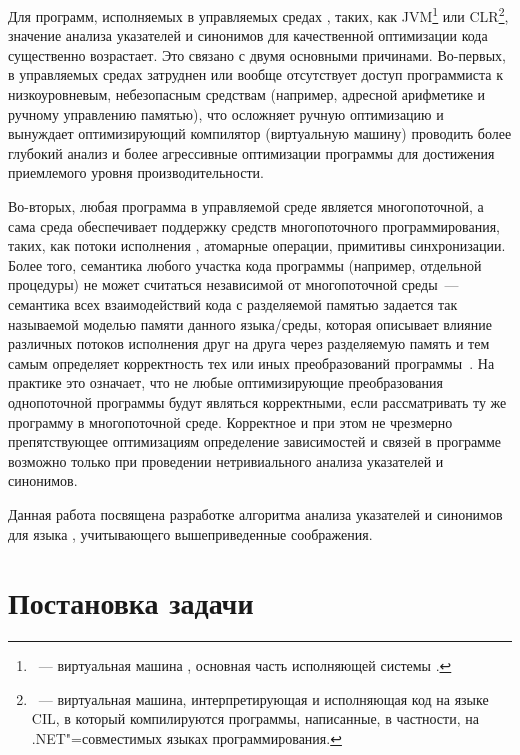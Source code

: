 \documentclass[14pt,titlepage,draft]{extarticle}
\newcommand{\java}{\eng{Java}\xspace}
\begin{document}
    Для программ, исполняемых в управляемых средах , таких, как JVM\footnote{~---
    виртуальная машина \java, основная часть исполняющей системы \java.} или
    CLR\footnote{~--- виртуальная машина,
    интерпретирующая и исполняющая код на языке CIL, в который компилируются
    программы, написанные, в частности, на .NET"=совместимых языках
    программирования.}, значение анализа указателей и синонимов для
    качественной оптимизации кода существенно возрастает. Это связано с двумя
    основными причинами. Во-первых, в управляемых средах затруднен или вообще
    отсутствует доступ программиста к низкоуровневым, небезопасным средствам
    (например, адресной арифметике и ручному управлению памятью), что
    осложняет ручную оптимизацию и вынуждает оптимизирующий компилятор
    (виртуальную машину) проводить более глубокий анализ и более агрессивные
    оптимизации программы для достижения приемлемого уровня производительности.

    Во-вторых, любая программа в управляемой среде является многопоточной, а
    сама среда обеспечивает поддержку средств многопоточного программирования,
    таких, как потоки исполнения , атомарные операции,
    примитивы синхронизации. Более того, семантика любого участка кода
    программы (например, отдельной процедуры) не может считаться
    независимой от многопоточной среды~--- семантика всех взаимодействий кода с
    разделяемой памятью задается так называемой моделью памяти данного
    языка/среды, которая описывает влияние различных потоков исполнения друг на
    друга через разделяемую память и тем самым определяет корректность тех или
    иных преобразований программы~\cite{manson_jmm}. На практике это означает,
    что не любые оптимизирующие преобразования однопоточной программы будут
    являться корректными, если рассматривать ту же программу в многопоточной
    среде. Корректное и при этом не чрезмерно препятствующее оптимизациям
    определение зависимостей и связей в программе возможно только при
    проведении нетривиального анализа указателей и синонимов.

    Данная работа посвящена разработке алгоритма анализа указателей и синонимов
    для языка \java, учитывающего вышеприведенные соображения.

  \section{Постановка задачи}
\end{document}
